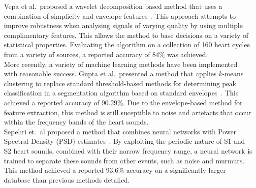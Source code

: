 \documentclass[titlepage, 12pt]{scrartcl} \usepackage{enumitem}
\begin{document}
Vepa et al.\ proposed a wavelet decomposition based method that uses a
combination of simplicity and envelope features~\parencite{Vepa2008}. This
approach attempts to improve robustness when analysing signals of varying
quality by using multiple complimentary features. This allows the method to base
decisions on a variety of statistical properties. Evaluating the algorithm on a
collection of 160 heart cycles from a variety of sources, a reported accuracy
of 84\% was achieved.\\

More recently, a variety of machine learning methods have been implemented with
reasonable success. Gupta et al.\ presented a method that applies $k$-means
clustering to replace standard threshold-based methods for determining peak
classification in a segmentation algorithm based on standard
envelopes~\parencite{Gupta2007}. This achieved a reported accuracy of 90.29\%.
Due to the envelope-based method for feature extraction, this method is still
suceptible to noise and artefacts that occur within the frequency bands of the
heart sounds.\\

Sepehri et.\ al proposed a method that combines neural networks with Power
Spectral Density (PSD) estimates~\parencite{Sepehri2010}.  By exploiting the
periodic nature of S1 and S2 heart sounds, combined with their narrow frequency
range, a neural network is trained to separate these sounds from other events,
such as noise and murmurs. This method achieved a reported 93.6\% accuracy on a
significantly larger database than previous methods detailed.\\
\end{document}
